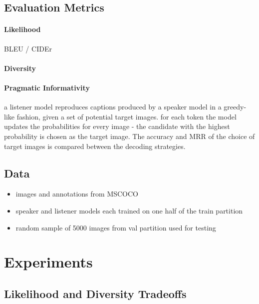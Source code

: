 \documentclass[11pt,a4paper]{article}
\begin{document}
\subsection{Evaluation Metrics}

\paragraph{Likelihood} BLEU / CIDEr
\paragraph{Diversity}
\paragraph{Pragmatic Informativity} a listener model reproduces captions produced by a speaker model in a greedy-like fashion, given a set of potential target images. for each token the model updates the probabilities for every image - the candidate with the highest probability is chosen as the target image. The accuracy and MRR of the choice of target images is compared between the decoding strategies.

\subsection{Data}

\begin{itemize}
	\item images and annotations from MSCOCO \citep{Lin2014}
	\item speaker and listener models each trained on one half of the train partition
	\item random sample of 5000 images from val partition used for testing
\end{itemize}


\section{Experiments}

\subsection{Likelihood and Diversity Tradeoffs}
\end{document}
